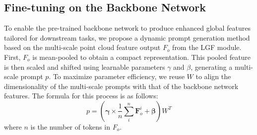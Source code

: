 %
%


\subsection{Fine-tuning on the Backbone Network}
\label{sec:FT_backbone}
To enable the pre-trained backbone network to produce enhanced global features tailored for downstream tasks, we propose a dynamic prompt generation method based on the multi-scale point cloud feature output $F_{o}$ from the LGF module. First, $F_{o}$ is mean-pooled to obtain a compact representation. This pooled feature is then scaled and shifted using learnable parameters $\gamma$ and $\beta$, generating a multi-scale prompt $p$. To maximize parameter efficiency, we reuse $W$ to align the dimensionality of the multi-scale prompts with that of the backbone network features. The formula for this process is as follows:
\begin{equation}
	p = \left( \boldsymbol{\gamma} \times \frac{1}{n}\sum_i^n{\boldsymbol{F}_{o}^i} + \boldsymbol{\beta} \right) W^T
\end{equation}
where $n$ is the number of tokens in $F_o$.


